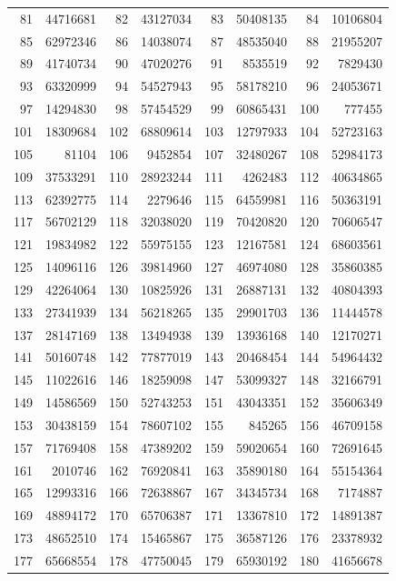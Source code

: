 \begin{longtable}{|r|r|r|r|r|r|r|r|}
81 & 44716681 & 82 & 43127034 & 83 & 50408135 & 84 & 10106804 \\
85 & 62972346 & 86 & 14038074 & 87 & 48535040 & 88 & 21955207 \\
89 & 41740734 & 90 & 47020276 & 91 & 8535519 & 92 & 7829430 \\
93 & 63320999 & 94 & 54527943 & 95 & 58178210 & 96 & 24053671 \\
97 & 14294830 & 98 & 57454529 & 99 & 60865431 & 100 & 777455 \\
101 & 18309684 & 102 & 68809614 & 103 & 12797933 & 104 & 52723163 \\
105 & 81104 & 106 & 9452854 & 107 & 32480267 & 108 & 52984173 \\
109 & 37533291 & 110 & 28923244 & 111 & 4262483 & 112 & 40634865 \\
113 & 62392775 & 114 & 2279646 & 115 & 64559981 & 116 & 50363191 \\
117 & 56702129 & 118 & 32038020 & 119 & 70420820 & 120 & 70606547 \\
121 & 19834982 & 122 & 55975155 & 123 & 12167581 & 124 & 68603561 \\
125 & 14096116 & 126 & 39814960 & 127 & 46974080 & 128 & 35860385 \\
129 & 42264064 & 130 & 10825926 & 131 & 26887131 & 132 & 40804393 \\
133 & 27341939 & 134 & 56218265 & 135 & 29901703 & 136 & 11444578 \\
137 & 28147169 & 138 & 13494938 & 139 & 13936168 & 140 & 12170271 \\
141 & 50160748 & 142 & 77877019 & 143 & 20468454 & 144 & 54964432 \\
145 & 11022616 & 146 & 18259098 & 147 & 53099327 & 148 & 32166791 \\
149 & 14586569 & 150 & 52743253 & 151 & 43043351 & 152 & 35606349 \\
153 & 30438159 & 154 & 78607102 & 155 & 845265 & 156 & 46709158 \\
157 & 71769408 & 158 & 47389202 & 159 & 59020654 & 160 & 72691645 \\
161 & 2010746 & 162 & 76920841 & 163 & 35890180 & 164 & 55154364 \\
165 & 12993316 & 166 & 72638867 & 167 & 34345734 & 168 & 7174887 \\
169 & 48894172 & 170 & 65706387 & 171 & 13367810 & 172 & 14891387 \\
173 & 48652510 & 174 & 15465867 & 175 & 36587126 & 176 & 23378932 \\
177 & 65668554 & 178 & 47750045 & 179 & 65930192 & 180 & 41656678 \\

\end{longtable}
